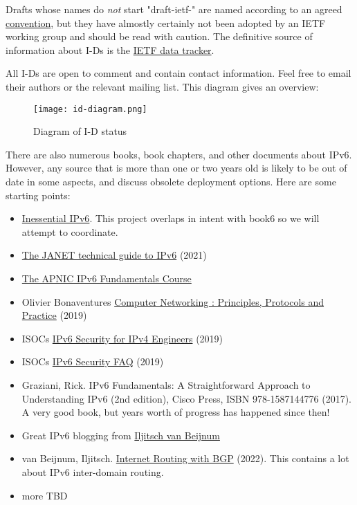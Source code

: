 \documentclass[
]{article}
\begin{document}
Drafts whose names do \emph{not} start "draft-ietf-" are named according
to an agreed
\href{https://authors.ietf.org/naming-your-internet-draft}{convention},
but they have almostly certainly not been adopted by an IETF working
group and should be read with caution. The definitive source of
information about I-Ds is the \href{https://datatracker.ietf.org/}{IETF
data tracker}.

All I-Ds are open to comment and contain contact information. Feel free
to email their authors or the relevant mailing list. This diagram gives
an overview:

\begin{figure}
\centering
\texttt{[image: id-diagram.png]}
\caption{Diagram of I-D status}
\end{figure}

There are also numerous books, book chapters, and other documents about
IPv6. However, any source that is more than one or two years old is
likely to be out of date in some aspects, and discuss obsolete
deployment options. Here are some starting points:

\begin{itemize}
\item
  \href{https://docs.google.com/document/d/1WohukYWdlFcEaSm-SQtX5Zgrkr-FZiZnfhlvoFi5Bl0/edit}{Inessential
  IPv6}. This project overlaps in intent with book6 so we will attempt
  to coordinate.
\item
  \href{https://repository.jisc.ac.uk/8349/1/janet-ipv6-technical-guide.pdf}{The
  JANET technical guide to IPv6} (2021)
\item
  \href{https://academy.apnic.net/en/course/ipv6-fundamentals}{The APNIC
  IPv6 Fundamentals Course}
\item
  Olivier Bonaventure\textquotesingle s
  \href{https://beta.computer-networking.info/syllabus/default/protocols/ipv6.html\#ip-version-6}{Computer
  Networking : Principles, Protocols and Practice} (2019)
\item
  ISOC\textquotesingle s
  \href{https://www.internetsociety.org/resources/deploy360/ipv6/security/ipv4-engineers/}{IPv6
  Security for IPv4 Engineers} (2019)
\item
  ISOC\textquotesingle s
  \href{https://www.internetsociety.org/deploy360/ipv6/security/faq/}{IPv6
  Security FAQ} (2019)
\item
  Graziani, Rick. IPv6 Fundamentals: A Straightforward Approach to
  Understanding IPv6 (2nd edition), Cisco Press, ISBN 978-1587144776
  (2017). A very good book, but years\textquotesingle{} worth of
  progress has happened since then!
\item
  Great IPv6 blogging from \href{https://ipv6.iljitsch.com/}{Iljitsch
  van Beijnum}
\item
  van Beijnum, Iljitsch.
  \href{https://www.iljitsch.com/2022/11-18-new-e-book-internet-routing-with-bgp.html}{Internet
  Routing with BGP} (2022). This contains a lot about IPv6 inter-domain
  routing.
\item
  more TBD
\end{itemize}
\end{document}
